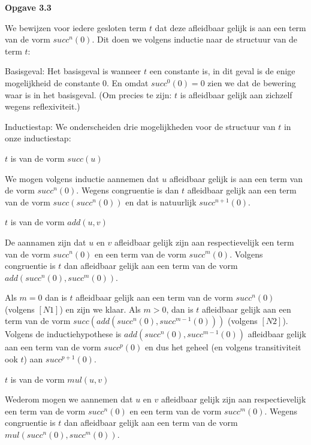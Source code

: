 \documentclass[a4paper,11pt]{article}
\begin{document}
{\bf Opgave 3.3}

We bewijzen voor iedere gesloten term $t$ dat deze afleidbaar gelijk is aan
een term van de vorm $succ^{n}(0)$. Dit doen we volgens inductie naar de
structuur van de term $t$:

\begin{description}

\item{Basisgeval:}
  Het basisgeval is wanneer $t$ een constante is, in dit geval is de enige
  mogelijkheid de constante $0$. En omdat $succ^0(0) = 0$ zien we dat de
  bewering waar is in het basisgeval. (Om precies te zijn: $t$ is afleidbaar
  gelijk aan zichzelf wegens reflexiviteit.)

\item{Inductiestap:}
  We onderscheiden drie mogelijkheden voor de structuur van $t$ in onze
  inductiestap:

  \begin{description}

  \item{$t$ is van de vorm $succ(u)$}

    We mogen volgens inductie aannemen dat $u$ afleidbaar gelijk is aan een
    term van de vorm $succ^{n}(0)$. Wegens congruentie is dan $t$ afleidbaar
    gelijk aan een term van de vorm $succ(succ^{n}(0))$ en dat is natuurlijk
    $succ^{n+1}(0)$.

  \item{$t$ is van de vorm $add(u, v)$}

    De aannamen zijn dat $u$ en $v$ afleidbaar gelijk zijn aan respectievelijk
    een term van de vorm $succ^{n}(0)$ en een term van de vorm
    $succ^{m}(0)$. Volgens congruentie is $t$ dan afleidbaar gelijk aan een
    term van de vorm $add(succ^{n}(0), succ^{m}(0))$.

    Als $m=0$ dan is $t$ afleidbaar gelijk aan een term van de vorm
    $succ^{n}(0)$ (volgens $[N1]$) en zijn we klaar. Als $m>0$, dan is $t$
    afleidbaar gelijk aan een term van de vorm $succ(add(succ^{n}(0),
    succ^{m-1}(0)))$ (volgens $[N2]$). Volgens de inductiehypothese is
    $add(succ^{n}(0), succ^{m-1}(0))$ afleidbaar gelijk aan een term van de
    vorm $succ^{p}(0)$ en dus het geheel (en volgens transitiviteit ook $t$)
    aan $succ^{p+1}(0)$.

  \item{$t$ is van de vorm $mul(u, v)$}

    Wederom mogen we aannemen dat $u$ en $v$ afleidbaar gelijk zijn aan
    respectievelijk een term van de vorm $succ^{n}(0)$ en een term van de vorm
    $succ^{m}(0)$. Wegens congruentie is $t$ dan afleidbaar gelijk aan een
    term van de vorm $mul(succ^{n}(0), succ^{m}(0))$.


\end{description}
\end{description}
\end{document}
